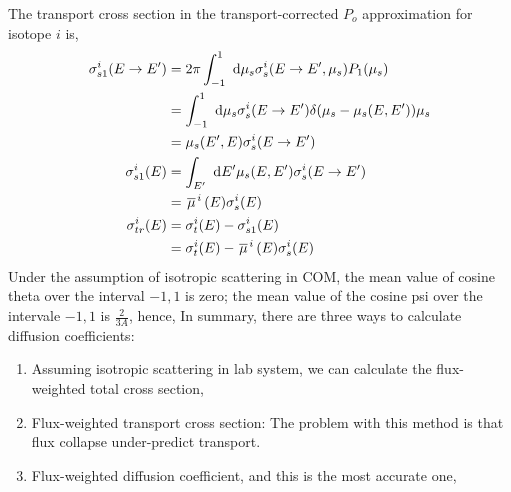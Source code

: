 \documentclass{school-22.211-notes}
\begin{document}
The transport cross section in the transport-corrected $P_o$ approximation for isotope $i$ is, 
\begin{align}
\sigma_{s1}^i (E\to E') &= 2 \pi \int_{-1}^1 \mbox{ }\mathrm{d} \mu_s \sigma_s^i (E\to E', \mu_s) P_1 (\mu_s) \\
&= \int_{-1}^1 \mbox{ }\mathrm{d} \mu_s \sigma_s^i (E \to E') \delta(\mu_s - \mu_s(E,E')) \mu_s \\
&= \mu_s (E', E) \sigma_s^i (E \to E') \\
\sigma_{s1}^i (E) &= \int_{E'} \mbox{ }\mathrm{d} E' \mu_s(E,E') \sigma_s^i (E\to E') \\
&= \left.\overline{\mu} \right.^i (E) \sigma_s^i (E) \\
\sigma_{tr}^i (E) &= \sigma_t^i (E)  - \sigma_{s1}^i (E)  \\
&= \sigma_t^i (E) - \left.\overline{\mu} \right.^i (E) \sigma_s^i (E)
\end{align}
Under the assumption of isotropic scattering in COM, the mean value of cosine theta over the interval $-1,1$ is zero; the mean value of the cosine psi over the intervale $-1,1$ is $\frac{2}{3A}$, hence,
In summary, there are three ways to calculate diffusion coefficients: 
\begin{enumerate}
\item Assuming isotropic scattering in lab system, we can calculate the flux-weighted total cross section,
\item Flux-weighted transport cross section: 
The problem with this method is that flux collapse under-predict transport. 
\item Flux-weighted diffusion coefficient, and this is the most accurate one,


\end{enumerate}
\end{document}
